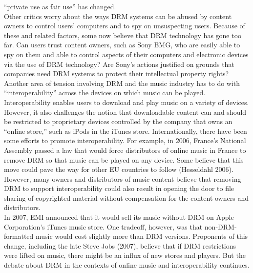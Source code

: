 \documentclass[12pt]{article}
\theoremstyle{definition}
\begin{document}
“private use as fair use” has changed.\\
Other critics worry about the ways DRM systems can be abused by content owners to
control users’ computers and to spy on unsuspecting users. Because of these and
related factors, some now believe that DRM technology has gone too far.
Can users trust content owners, such as Sony BMG, who are easily
able to spy on them and able to control aspects of their computers and electronic devices
via the use of DRM technology? Are Sony’s actions justified on grounds that companies
need DRM systems to protect their intellectual property rights?\\
Another area of tension involving DRM and the music industry has to do with
“interoperability” across the devices on which music can be played. Interoperability
enables users to download and play music on a variety of devices. However, it also
challenges the notion that downloadable content can and should be restricted to
proprietary devices controlled by the company that owns an “online store,” such as
iPods in the iTunes store. Internationally, there have been some efforts to promote
interoperability. For example, in 2006, France’s National Assembly passed a law that
would force distributors of online music in France to remove DRM so that music can be
played on any device. Some believe that this move could pave the way for other EU
countries to follow (Hesseldahl 2006). However, many owners and distributors of music
content believe that removing DRM to support interoperability could also result in
opening the door to file sharing of copyrighted material without compensation for the
content owners and distributors.\\
In 2007, EMI announced that it would sell its music without DRM on Apple
Corporation’s iTunes music store. One tradeoff, however, was that non-DRM-formatted
music would cost slightly more than DRM versions. Proponents of this change, including
the late Steve Jobs (2007), believe that if DRM restrictions were lifted on music, there
might be an influx of new stores and players. But the debate about DRM in the contexts
of online music and interoperability continues.\\
\end{document}
